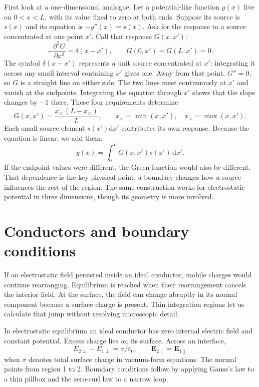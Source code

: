 \documentclass[11pt,oneside]{book}
\newcommand{\dd}{\mathrm{d}}
\newcommand{\vect}[1]{\boldsymbol{#1}}
\newcommand{\eps}{\varepsilon_0}
\theoremstyle{reviewstyle}
\begin{document}
First look at a one-dimensional analogue. Let a potential-like function $y(x)$ live on $0<x<L$, with its value fixed to zero at both ends. Suppose its source is $s(x)$ and its equation is $-y''(x)=s(x)$. Ask for the response to a source concentrated at one point $x'$. Call that response $G(x,x')$:
\begin{equation}
-\frac{\partial^2G}{\partial x^2}=\delta(x-x'),
\qquad G(0,x')=G(L,x')=0.
\end{equation}
The symbol $\delta(x-x')$ represents a unit source concentrated at $x'$: integrating it across any small interval containing $x'$ gives one. Away from that point, $G''=0$, so $G$ is a straight line on either side. The two lines meet continuously at $x'$ and vanish at the endpoints. Integrating the equation through $x'$ shows that the slope changes by $-1$ there. These four requirements determine
\begin{equation}
G(x,x')=\frac{x_<\,(L-x_>)}{L},\qquad
x_<=\min(x,x'),\quad x_>=\max(x,x').
\end{equation}
Each small source element $s(x')\dd x'$ contributes its own response. Because the equation is linear, we add them:
\begin{equation}
y(x)=\int_0^L G(x,x')s(x')\,\dd x'.
\end{equation}
If the endpoint values were different, the Green function would also be different. That dependence is the key physical point: a boundary changes how a source influences the rest of the region. The same construction works for electrostatic potential in three dimensions, though its geometry is more involved.

\section{Conductors and boundary conditions}
If an electrostatic field persisted inside an ideal conductor, mobile charges would continue rearranging. Equilibrium is reached when their rearrangement cancels the interior field. At the surface, the field can change abruptly in its normal component because a surface charge is present. Thin integration regions let us calculate that jump without resolving microscopic detail.

In electrostatic equilibrium an ideal conductor has zero internal electric field and constant potential. Excess charge lies on its surface. Across an interface,
\begin{equation}E_{2\perp}-E_{1\perp}=\sigma/\eps,\qquad \vect E_{2\parallel}=\vect E_{1\parallel}\end{equation}
when $\sigma$ denotes total surface charge in vacuum-form equations. The normal points from region 1 to 2. Boundary conditions follow by applying Gauss's law to a thin pillbox and the zero-curl law to a narrow loop.
\end{document}
